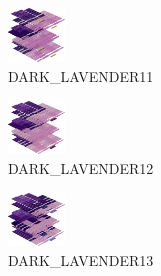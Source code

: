 \hspace{0.1cm}
\begin{minipage}[b]{0.15\linewidth}
\begin{figure}[H]                                                          
  \centering                                                             
  \begin{adjustbox}{width=1.5cm,center}                                   
  \includegraphics[width=1.5cm]{src/colorspace_colourflow/flows/colourflow_91-45.png}%
  \end{adjustbox}                                                        
\caption*{DARK\_LAVENDER11}                                           
\end{figure}                                                               
\end{minipage}
\hspace{0.1cm}
\begin{minipage}[b]{0.15\linewidth}
\begin{figure}[H]                                                          
  \centering                                                             
  \begin{adjustbox}{width=1.5cm,center}                                   
  \includegraphics[width=1.5cm]{src/colorspace_colourflow/flows/colourflow_92-45.png}%
  \end{adjustbox}                                                        
\caption*{DARK\_LAVENDER12}                                           
\end{figure}                                                               
\end{minipage}
\hspace{0.1cm}
\begin{minipage}[b]{0.15\linewidth}
\begin{figure}[H]                                                          
  \centering                                                             
  \begin{adjustbox}{width=1.5cm,center}                                   
  \includegraphics[width=1.5cm]{src/colorspace_colourflow/flows/colourflow_93-45.png}%
  \end{adjustbox}                                                        
\caption*{DARK\_LAVENDER13}                                           
\end{figure}                                                               
\end{minipage}
